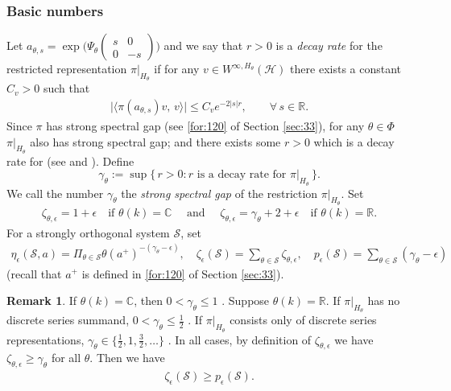 \documentclass[11 pt]{amsart}
\newcommand{\RR}{\mathbb{R}}
\newcommand{\CC}{\mathbb{C}}
\theoremstyle{definition}
\newtheorem{remark}[theorem]{Remark}
\numberwithin{equation}{section}
\begin{document}
\subsubsection{Basic numbers}\label{for:222}    Let $a_{\theta,s}=\exp\big(\Psi_\theta\!\begin{pmatrix} s & 0 \\ 0 & -s \end{pmatrix}\big)$ and  we say that $r>0$ is a \emph{decay rate} for the restricted representation  $\pi|_{H_\theta}$ if for any $v\in W^{\infty,H_\theta}(\mathcal{H})$ there exists a constant $C_{v}>0$ such that
  \begin{align}
\big|\langle \pi(a_{\theta,s})v,\, v\rangle \big|\leq C_{v}e^{-2|s|r}, \qquad \forall\,s\in\RR.
\end{align}
Since $\pi$ has strong spectral gap (see \eqref{for:120} of Section \ref{sec:33}), for any $\theta\in \Phi$ $\pi|_{H_\theta}$ also has strong spectral gap; and there exists some $r>0$
which is a decay rate for  (see \cite{Kleinbock} and \cite{Spatzier1}). Define
\[
\gamma_\theta:=\sup\bigl\{\,r>0 : r \text{ is a decay rate for }\pi|_{H_\theta}\,\bigr\}.
\]
We call the number $\gamma_\theta$ the \emph{strong spectral gap} of the restriction $\pi|_{H_\theta}$. Set
\begin{align*}
 \zeta_{\theta,\epsilon}=1+\epsilon \quad\text{if } \theta(k) = \CC \quad\text{ and }\quad\zeta_{\theta,\epsilon}=\gamma_\theta+2+\epsilon \quad\text{if } \theta(k) = \RR.
\end{align*}
For a strongly orthogonal system $\mathcal{S}$, set
\begin{align*}
  \eta_\epsilon(\mathcal{S}, a)=\Pi_{\theta\in \mathcal{S}}\theta(a^+)^{-(\gamma_\theta-\epsilon)},\quad \zeta_{\epsilon}(\mathcal{S})=\sum_{\theta\in \mathcal{S}}\zeta_{\theta,\epsilon},
  \quad p_{\epsilon}(\mathcal{S})=\sum_{\theta\in \mathcal{S}}(\gamma_{\theta}-\epsilon)
 \end{align*}
 (recall that $a^+$ is defined in \eqref{for:120} of Section \ref{sec:33}).
\begin{remark}\label{re:12}
 If $\theta(k)=\CC$, then $0<\gamma_\theta\leq1$ \cite{Wallach}. Suppose $\theta(k)=\RR$. If $\pi|_{H_\theta}$ has no discrete series summand, $0<\gamma_\theta\leq\frac{1}{2}$ \cite{tan}. If $\pi|_{H_\theta}$ consists only of discrete series representations, $\gamma_\theta\in \{\tfrac12,1,\tfrac32,\dots\}$ \cite{Wallach}.
 In all cases, by definition of \(\zeta_{\theta,\epsilon}\) we have $\zeta_{\theta,\epsilon}\geq \gamma_\theta $ for all \(\theta\). Then we have
\begin{align}\label{for:4}
\zeta_{\epsilon}(\mathcal S)\ge p_{\epsilon}(\mathcal S).
\end{align}

\end{remark}
\end{document}
